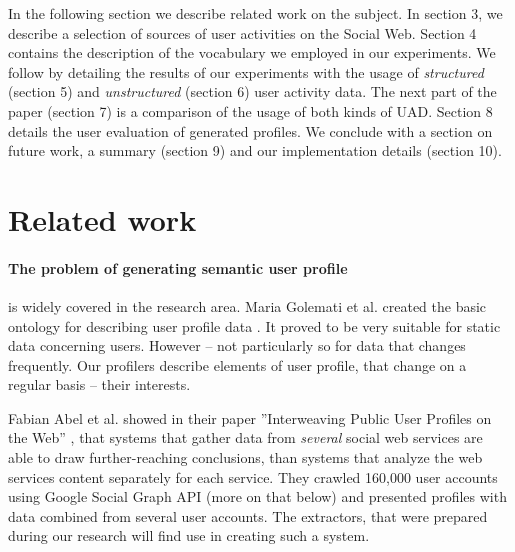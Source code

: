 In the following section we describe related work on the subject. In section 3, we describe
a selection of sources of user activities on the Social Web. Section 4 contains the description of
the vocabulary we employed in our experiments. We follow by detailing the results of our experiments
with the usage of \textit{structured} (section 5) and \textit{unstructured} (section 6) user activity data.
The next part of the paper (section 7) is a comparison of the usage of both kinds of UAD. Section 8
details the user evaluation of generated profiles. We conclude with a section on future
work, a summary (section 9) and our implementation details (section 10).

\section{Related work}

\paragraph{The problem of generating semantic user profile} is widely covered in the
research area. Maria Golemati et al. created the basic ontology for describing
user profile data \cite{creating-ontology-for-user-profile}. It proved to be
very suitable for static data concerning users. However -- not particularly
so for data that changes frequently. Our profilers describe elements of user
profile, that change on a regular basis -- their interests.  

Fabian Abel et al. showed in their
paper ''Interweaving Public User Profiles on the Web'' \cite{public-profiles},
that systems that gather data from \textit{several} social web services are
able to draw further-reaching conclusions, than systems that analyze the web
services content separately for each service. They crawled 160,000 user
accounts using Google Social Graph API (more on that below) and presented
profiles with data combined from several user accounts.  The extractors, that
were prepared during our research will find use in creating such a system.

